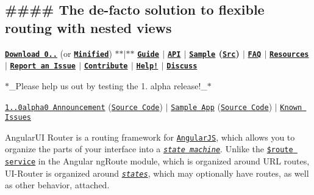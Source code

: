 \subsection*{\#\#\#\# The de-\/facto solution to flexible routing with nested views }

{\bfseries \href{https://cdn.rawgit.com/angular-ui/ui-router/0.2.18/release/angular-ui-router.js}{\tt Download 0..}} (or {\bfseries \href{https://cdn.rawgit.com/angular-ui/ui-router/0.2.18/release/angular-ui-router.min.js}{\tt Minified}}) $\ast$$\ast$$\vert$$\ast$$\ast$ {\bfseries \href{https://github.com/angular-ui/ui-router/wiki}{\tt Guide} $\vert$} {\bfseries \href{http://angular-ui.github.io/ui-router/site}{\tt A\+PI} $\vert$} {\bfseries \href{http://angular-ui.github.com/ui-router/sample/}{\tt Sample} (\href{https://github.com/angular-ui/ui-router/tree/gh-pages/sample}{\tt Src}) $\vert$} {\bfseries \href{https://github.com/angular-ui/ui-router/wiki/Frequently-Asked-Questions}{\tt F\+AQ} $\vert$} {\bfseries \href{#resources}{\tt Resources} $\vert$} {\bfseries \href{https://github.com/angular-ui/ui-router/blob/master/CONTRIBUTING.md#report-an-issue}{\tt Report an Issue} $\vert$} {\bfseries \href{https://github.com/angular-ui/ui-router/blob/master/CONTRIBUTING.md#contribute}{\tt Contribute} $\vert$} {\bfseries \href{http://stackoverflow.com/questions/ask?tags=angularjs,angular-ui-router}{\tt Help!} $\vert$} {\bfseries \href{https://groups.google.com/forum/#!categories/angular-ui/router}{\tt Discuss}} 



$\ast$\+\_\+\+Please help us out by testing the 1. alpha release!\+\_\+$\ast$

\href{https://github.com/angular-ui/ui-router/releases/tag/1.0.0alpha0}{\tt 1..\+0alpha0 Announcement} (\href{https://github.com/angular-ui/ui-router/tree/master}{\tt Source Code}) $\vert$ \href{http://ui-router.github.io/sample-app/}{\tt Sample App} (\href{https://github.com/ui-router/sample-app}{\tt Source Code}) $\vert$ \href{https://github.com/angular-ui/ui-router/issues?q=is%3Aissue+is%3Aopen+label%3A1.0}{\tt Known Issues}





Angular\+UI Router is a routing framework for \href{http://angularjs.org}{\tt Angular\+JS}, which allows you to organize the parts of your interface into a \href{https://en.wikipedia.org/wiki/Finite-state_machine}{\tt {\itshape state machine}}. Unlike the \href{http://docs.angularjs.org/api/ngRoute.$route}{\tt {\ttfamily \$route} service} in the Angular ng\+Route module, which is organized around U\+RL routes, U\+I-\/\+Router is organized around \href{https://github.com/angular-ui/ui-router/wiki}{\tt {\itshape states}}, which may optionally have routes, as well as other behavior, attached.

